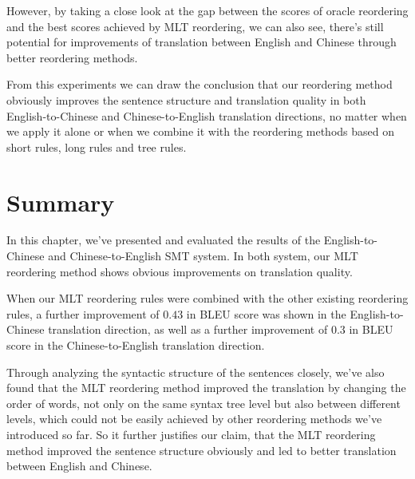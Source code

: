 However, by taking a close look at the gap between the scores of oracle reordering and the best scores achieved by \ac{MLT} reordering, we can also see, there's still potential for improvements of translation between English and Chinese through better reordering methods.

From this experiments we can draw the conclusion that our reordering method obviously improves the sentence structure and  translation quality in both English-to-Chinese and Chinese-to-English translation directions, no matter when we apply it alone or when we combine it with the reordering methods based on short rules, long rules and tree rules. 




\section{Summary}
\label{ch:Evaluation:sec:Conclusion}

In this chapter, we've presented and evaluated the results of the English-to-Chinese and Chinese-to-English \ac{SMT} system. In both system, our \ac{MLT} reordering method shows obvious improvements on translation quality.

When our \ac{MLT} reordering rules were combined with the other existing reordering rules, a further improvement of $0.43$ in \ac{BLEU} score was shown in the English-to-Chinese translation direction, as well as a further improvement of $0.3$ in \ac{BLEU} score in the Chinese-to-English translation direction.

Through analyzing the syntactic structure of the sentences closely, we've also found that the \ac{MLT} reordering method improved the translation by changing the order of words, not only on the same syntax tree level but also between different levels, which could not be easily achieved by other reordering methods we've introduced so far. So it further justifies our claim, that the \ac{MLT} reordering method improved the sentence structure obviously and led to better translation between English and Chinese.
